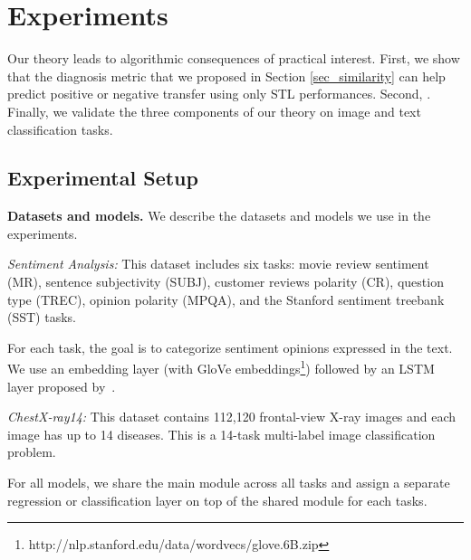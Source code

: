 \section{Experiments}

Our theory leads to algorithmic consequences of practical interest.
First, we show that the diagnosis metric that we proposed in Section \ref{sec_similarity} can help predict positive or negative transfer using only STL performances.
Second, \todo{}.
Finally, we validate the three components of our theory on image and text classification tasks.

\subsection{Experimental Setup}

{\bf Datasets and models.} We describe the datasets and models we use in the experiments.

{\it Sentiment Analysis:} This dataset includes six tasks: movie review sentiment (MR), sentence subjectivity (SUBJ), customer reviews polarity (CR), question type (TREC), opinion polarity (MPQA), and the Stanford sentiment treebank (SST) tasks.

{For each task, the goal is to categorize sentiment opinions expressed in the text.
We use an embedding layer (with GloVe embeddings\footnote{http://nlp.stanford.edu/data/wordvecs/glove.6B.zip}) followed by an LSTM layer proposed by~\cite{lei2018simple}.
}

{\it ChestX-ray14:} This dataset contains 112,120 frontal-view X-ray images and each image has up to 14 diseases.
This is a 14-task multi-label image classification problem.

For all models, we share the main module across all tasks and assign a separate regression or classification layer on top of the shared module for each tasks.

